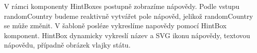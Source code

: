 V rámci komponenty HintBoxes postupně zobrazíme nápovědy. Podle vstupu randomCountry budeme reaktivně vytvářet pole nápověd, jelikož randomCountry se může změnit. 
V šabloně posléze vykreslíme napovědy pomocí HintBox komponent. HintBox dynamicky vykreslí název a SVG ikonu nápovědy, textovou nápovědu, případně obrázek vlajky státu.





